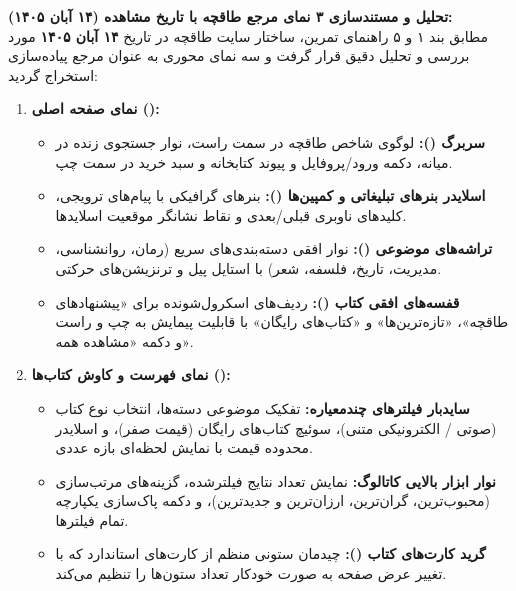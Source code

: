 \documentclass[12pt]{exam}
\begin{document}
\begin{questions}
\question
\textbf{تحلیل و مستندسازی ۳ نمای مرجع طاقچه با تاریخ مشاهده (۱۴ آبان ۱۴۰۵):}
\\
مطابق بند ۱ و ۵ راهنمای تمرین، ساختار سایت طاقچه در تاریخ \textbf{۱۴ آبان ۱۴۰۵} مورد بررسی و تحلیل دقیق قرار گرفت و سه نمای محوری به عنوان مرجع پیاده‌سازی استخراج گردید:
\begin{enumerate}
    \item \textbf{نمای صفحه اصلی ():}
    \begin{itemize}
        \item \textbf{سربرگ ():} لوگوی شاخص طاقچه در سمت راست، نوار جستجوی زنده در میانه، دکمه ورود/پروفایل و پیوند کتابخانه و سبد خرید در سمت چپ.
        \item \textbf{اسلایدر بنرهای تبلیغاتی و کمپین‌ها ():} بنرهای گرافیکی با پیام‌های ترویجی، کلیدهای ناوبری قبلی/بعدی و نقاط نشانگر موقعیت اسلایدها.
        \item \textbf{تراشه‌های موضوعی ():} نوار افقی دسته‌بندی‌های سریع (رمان، روانشناسی، مدیریت، تاریخ، فلسفه، شعر) با استایل پیل و ترنزیشن‌های حرکتی.
        \item \textbf{قفسه‌های افقی کتاب ():} ردیف‌های اسکرول‌شونده برای «پیشنهادهای طاقچه»، «تازه‌ترین‌ها» و «کتاب‌های رایگان» با قابلیت پیمایش به چپ و راست و دکمه «مشاهده همه».
    \end{itemize}

    \item \textbf{نمای فهرست و کاوش کتاب‌ها ():}
    \begin{itemize}
        \item \textbf{سایدبار فیلترهای چندمعیاره:} تفکیک موضوعی دسته‌ها، انتخاب نوع کتاب (صوتی / الکترونیکی متنی)، سوئیچ کتاب‌های رایگان (قیمت صفر)، و اسلایدر محدوده قیمت با نمایش لحظه‌ای بازه عددی.
        \item \textbf{نوار ابزار بالایی کاتالوگ:} نمایش تعداد نتایج فیلترشده، گزینه‌های مرتب‌سازی (محبوب‌ترین، گران‌ترین، ارزان‌ترین و جدیدترین)، و دکمه پاک‌سازی یکپارچه تمام فیلترها.
        \item \textbf{گرید کارت‌های کتاب ():} چیدمان ستونی منظم از کارت‌های استاندارد که با تغییر عرض صفحه به صورت خودکار تعداد ستون‌ها را تنظیم می‌کند.
    \end{itemize}


\end{enumerate}
\end{questions}
\end{document}

